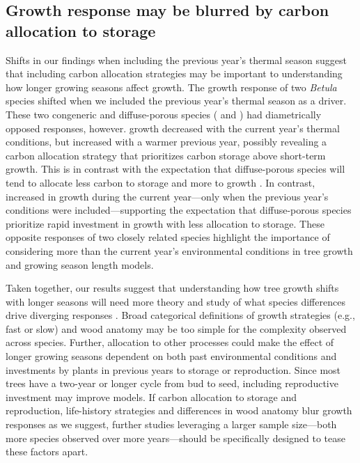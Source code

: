 \documentclass{article}\usepackage[]{graphicx}\usepackage[]{xcolor}
\begin{document}
\subsection{Growth response may be blurred by carbon allocation to storage}
Shifts in our findings when including the previous year's thermal season suggest that including carbon allocation strategies may be important to understanding how longer growing seasons affect growth. The growth response of two \textit{Betula} species shifted when we included the previous year's thermal season as a driver. These two congeneric and diffuse-porous species ({\Ball} and {\Bnig}) had diametrically opposed responses, however. {\Ball} growth decreased with the current year's thermal conditions, but increased with a warmer previous year, possibly revealing a carbon allocation strategy that prioritizes carbon storage above short-term growth. This is in contrast with the expectation that diffuse-porous species will tend to allocate less carbon to storage and more to growth \citep{barbaroux_contrasting_2002,muhr_how_2016}. In contrast, {\Bnig} increased in growth during the current year---only when the previous year's conditions were included---supporting the expectation that diffuse-porous species prioritize rapid investment in growth with less allocation to storage. These opposite responses of two closely related species highlight the importance of considering more than the current year's environmental conditions in tree growth and growing season length models.

Taken together, our results suggest that understanding how tree growth shifts with longer seasons will need more theory and study of what species differences drive diverging responses \citep{cufar_treering_2008,delpierre_temperate_2016,silvestro_longer_2023}. Broad categorical definitions of growth strategies (e.g., fast or slow) and wood anatomy may be too simple for the complexity observed across species. Further, allocation to other processes could make the effect of longer growing seasons dependent on both past environmental conditions and investments by plants in previous years to storage or reproduction. Since most trees have a two-year or longer cycle from bud to seed, including reproductive investment may improve models. If carbon allocation to storage and reproduction, life-history strategies and differences in wood anatomy blur growth responses as we suggest, further studies leveraging a larger sample size---both more species observed over more years---should be specifically designed to tease these factors apart. %
\end{document}
